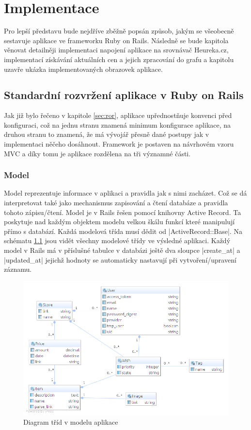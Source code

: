 \chapter{Implementace}
Pro lepší představu bude nejdříve zběžně popsán způsob, jakým se všeobecně sestavuje aplikace ve frameworku Ruby on Rails. Následně se bude kapitola věnovat detailněji implementaci napojení aplikace na srovnávač Heureka.cz, implementací získávání aktuálních cen a jejich zpracování do grafu a kapitolu uzavře ukázka implementovaných obrazovek aplikace.

\section{Standardní rozvržení aplikace v Ruby on Rails}
Jak již bylo řečeno v kapitole \ref{sec:ror}, aplikace upřednostňuje konvenci před konfiguraci, což na jednu stranu znamená minimum konfigurace aplikace, na druhou stranu to znamená, že má vývojář přesně dané postupy jak v implementaci něčeho dosáhnout. Framework je postaven na návrhovém vzoru MVC a díky tomu je aplikace rozdělena na tři významné části.

\subsection{Model}
Model reprezentuje informace v aplikaci a pravidla jak s nimi zacházet. Což se dá interpretovat také jako mechanismus zapisování a čtení databáze a pravidla tohoto zápisu/čtení. Model je v Rails řešen pomocí knihovny Active Record. Ta poskytuje nad každým objektem modelu velkou škálu funkcí které manipulují přímo s databází. Každá modelová třída musí dědit od |ActiveRecord::Base|. Na schématu \ref{fig:model-diagram} jsou vidět všechny modelové třídy ve výsledné aplikaci. Každý model v Rails má v příslušné tabulce v databázi ještě dva sloupce |create_at| a |updated_at| jejichž hodnoty se automaticky nastavují při vytvoření/upravení záznamu.

\begin{figure}[htb]
\begin{center}
\includegraphics[width=120mm]{./pictures/model-diagram.png}
\caption{Diagram tříd v modelu aplikace}
\label{fig:model-diagram}
\end{center}
\end{figure}

